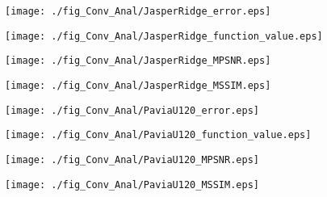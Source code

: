 \begin{figure*}[t]
    \begin{center}
        \begin{minipage}{0.240\hsize}
            \centerline{\texttt{[image: ./fig\_Conv\_Anal/JasperRidge\_error.eps]}}
        \end{minipage}
        \begin{minipage}{0.240\hsize}
            \centerline{\texttt{[image: ./fig\_Conv\_Anal/JasperRidge\_function\_value.eps]}}
        \end{minipage}
        \begin{minipage}{0.240\hsize}
            \centerline{\texttt{[image: ./fig\_Conv\_Anal/JasperRidge\_MPSNR.eps]}}
        \end{minipage}
        \begin{minipage}{0.240\hsize}
            \centerline{\texttt{[image: ./fig\_Conv\_Anal/JasperRidge\_MSSIM.eps]}}
        \end{minipage}

        \vspace{1mm}

        \begin{minipage}{0.240\hsize}
            \centerline{\texttt{[image: ./fig\_Conv\_Anal/PaviaU120\_error.eps]}}
        \end{minipage}
        \begin{minipage}{0.240\hsize}
            \centerline{\texttt{[image: ./fig\_Conv\_Anal/PaviaU120\_function\_value.eps]}}
        \end{minipage}
        \begin{minipage}{0.240\hsize}
            \centerline{\texttt{[image: ./fig\_Conv\_Anal/PaviaU120\_MPSNR.eps]}}
        \end{minipage}
        \begin{minipage}{0.240\hsize}
            \centerline{\texttt{[image: ./fig\_Conv\_Anal/PaviaU120\_MSSIM.eps]}}
        \end{minipage}
        
        \vspace{1mm}
        

\end{center}
\end{figure*}
